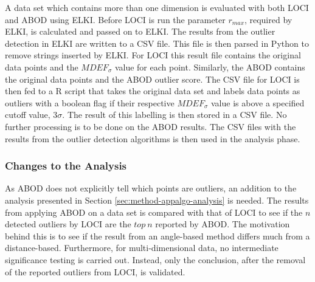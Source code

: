 A data set which contains more than one dimension is evaluated with both LOCI and ABOD using ELKI\@. Before LOCI is run the parameter $r_{max}$, required by ELKI, is calculated and passed on to ELKI\@. The results from the outlier detection in ELKI are written to a CSV file. This file is then parsed in \textsf{Python} to remove strings inserted by ELKI\@. For LOCI this result file contains the original data points and the $MDEF_{\sigma}$ value for each point. Similarly, the ABOD contains the original data points and the ABOD outlier score. The CSV file for LOCI is then fed to a \textsf{R} script that takes the original data set and labels data points as outliers with a boolean flag if their respective $MDEF_{\sigma}$ value is above a specified cutoff value, $3\sigma$. The result of this labelling is then stored in a CSV file. No further processing is to be done on the ABOD results. The CSV files with the results from the outlier detection algorithms is then used in the analysis phase.


\subsubsection{Changes to the Analysis}
\label{sec:resultsprestudy-changestotheanalysis}
As ABOD does not explicitly tell which points are outliers, an addition to the analysis presented in Section \ref{sec:method-appalgo-analysis} is needed. The results from applying ABOD on a data set is compared with that of LOCI to see if the $n$ detected outliers by LOCI are the $top\ n$ reported by ABOD\@. The motivation behind this is to see if the result from an angle-based method differs much from a distance-based. Furthermore, for multi-dimensional data, no intermediate significance testing is carried out. Instead, only the conclusion, after the removal of the reported outliers from LOCI, is validated.
